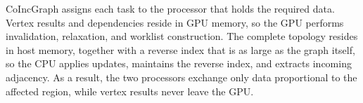 CoIncGraph assigns each task to the processor that holds the required data. Vertex results and dependencies reside in GPU memory, so the GPU performs invalidation, relaxation, and worklist construction. The complete topology resides in host memory, together with a reverse index that is as large as the graph itself, so the CPU applies updates, maintains the reverse index, and extracts incoming adjacency. As a result, the two processors exchange only data proportional to the affected region, while vertex results never leave the GPU.


